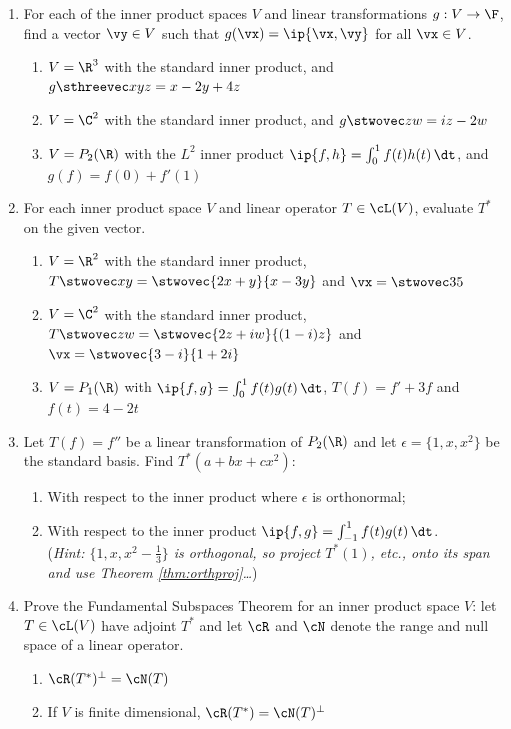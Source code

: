 \begin{exercises}
\begin{enumerate}[label=\thesubsection.\arabic*., align=right]
  \item For each of the inner product spaces $V$ and linear transformations $g:V\to\F$, find a vector $\vy\in V$ such that $g(\vx)=\ip{\vx,\vy}$ for all $\vx\in V$.
  \begin{enumerate}
    \item $V=\R^3$ with the standard inner product, and $g\sthreevec xyz=x-2y+4z$
    \item $V=\C^2$ with the standard inner product, and $g\stwovec zw=iz-2w$
    \item $V=P_2(\R)$ with the $L^2$ inner product $\ip{f,h}=\int_0^1 f(t)h(t)\,\dt$, and $g(f)=f(0)+f'(1)$
  \end{enumerate}
  
  \item For each inner product space $V$ and linear operator $T\in\cL(V)$, evaluate $T^*$ on the given vector.
  \begin{enumerate}
    \item $V=\R^2$ with the standard inner product, $T\stwovec xy=\stwovec{2x+y}{x-3y}$ and $\vx=\stwovec 35$
    \item $V=\C^2$ with the standard inner product, $T\stwovec zw=\stwovec{2z+iw}{(1-i)z}$ and $\vx=\stwovec{3-i}{1+2i}$
    \item $V=P_1(\R)$ with $\ip{f,g}=\int_0^1 f(t)g(t)\,\dt$, $T(f)=f'+3f$ and $f(t)=4-2t$
  \end{enumerate}
  
  \item Let $T(f)=f''$ be a linear transformation of $P_2(\R)$ and let $\epsilon=\{1,x,x^2\}$ be the standard basis. Find $T^*(a+bx+cx^2)$:
  \begin{enumerate}
    \item With respect to the inner product where $\epsilon$ is orthonormal;
    \item With respect to the inner product $\ip{f,g}=\int_{-1}^1f(t)g(t)\,\dt$.\\
    (\emph{Hint: $\{1,x,x^2-\frac 13\}$ is orthogonal, so project $T^*(1)$, etc., onto its span and use Theorem \ref{thm:orthproj}\ldots})
  \end{enumerate}

  \item\label{ex:fundssthm} Prove the Fundamental Subspaces Theorem for an inner product space $V$: let $T\in\cL(V)$ have adjoint $T^*$ and let $\cR$ and $\cN$ denote the range and null space of a linear operator.
  \begin{enumerate}
    \item $\cR(T^*)^\perp=\cN(T)$
    \item If $V$ is finite dimensional, $\cR(T^*)=\cN(T)^\perp$
  \end{enumerate}
  

\end{enumerate}
\end{exercises}
